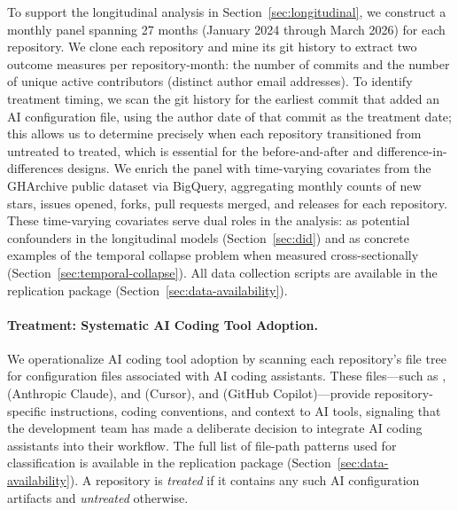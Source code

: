 To support the longitudinal analysis in Section~\ref{sec:longitudinal}, we construct a monthly panel spanning 27 months (January 2024 through March 2026) for each repository.
We clone each repository and mine its git history to extract two outcome measures per repository-month: the number of commits and the number of unique active contributors (distinct author email addresses).
To identify treatment timing, we scan the git history for the earliest commit that added an AI configuration file, using the author date of that commit as the treatment date; this allows us to determine precisely when each repository transitioned from untreated to treated, which is essential for the before-and-after and difference-in-differences designs.
We enrich the panel with time-varying covariates from the GHArchive public dataset via BigQuery, aggregating monthly counts of new stars, issues opened, forks, pull requests merged, and releases for each repository.
These time-varying covariates serve dual roles in the analysis: as potential confounders in the longitudinal models (Section~\ref{sec:did}) and as concrete examples of the temporal collapse problem when measured cross-sectionally (Section~\ref{sec:temporal-collapse}).
All data collection scripts are available in the replication package (Section~\ref{sec:data-availability}).

\paragraph{Treatment: Systematic AI Coding Tool Adoption.}
We operationalize AI coding tool adoption by scanning each repository's file tree for configuration files associated with AI coding assistants.
These files---such as ,   (Anthropic Claude),  and  (Cursor), and  (GitHub Copilot)---provide repository-specific instructions, coding conventions, and context to AI tools, signaling that the development team has made a deliberate decision to integrate AI coding assistants into their workflow.
The full list of file-path patterns used for classification is available in the replication package (Section~\ref{sec:data-availability}).
A repository is \emph{treated} if it contains any such AI configuration artifacts and \emph{untreated} otherwise.

